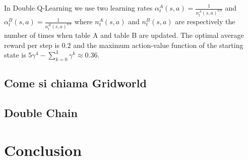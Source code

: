 \documentclass[conference]{IEEEtran}
\begin{document}
In Double Q-Learning we use two learning rates $\alpha_t^A(s, a) = \frac{1}{n_t^A(s, a)^{0.8}}$ and $\alpha_t^B(s, a) = \frac{1}{n_t^B(s, a)^{0.8}}$ where $n_t^A(s, a)$ and $n_t^B(s, a)$ are respectively the number of times when table A and table B are updated. 
The optimal average reward per step is $0.2$ and the maximum action-value function of the starting state is $5\gamma^4 - \sum_{k=0}^3 \gamma^k \approx 0.36$.
\subsection{Come si chiama Gridworld}

\subsection{Double Chain}

\section{Conclusion}









\end{document}
